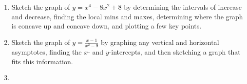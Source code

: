 \begin{enumerate}
\item Sketch the graph of $y = x^4 - 8x^2 + 8$ by determining the intervals of increase and decrease, finding the local mins and maxes, determining where the graph is concave up and concave down, and plotting a few key points.


\item Sketch the graph of $y = \frac{x-1}{x^2-9}$ by graphing any vertical and horizontal asymptotes, finding the $x$- and $y$-intercepts, and then sketching a graph that fits this information.

\item 
\end{enumerate}
